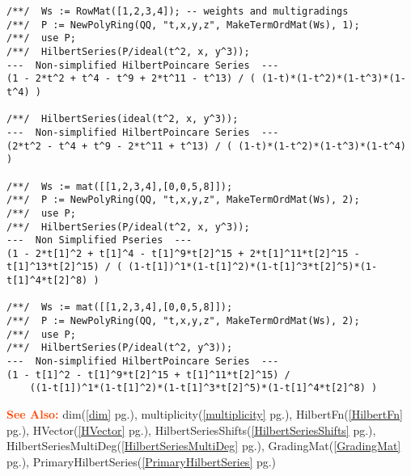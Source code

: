 \documentclass[a4paper]{mybook}
\newenvironment{command}{}{} %
\newcommand\SeeAlso{\par\textcolor{OrangeRed}{\textbf{\large See Also: }}}
\begin{document}
\begin{command}
\begin{Verbatim}[label=example, rulecolor=\color{PineGreen}, frame=single]
/**/  Ws := RowMat([1,2,3,4]); -- weights and multigradings
/**/  P := NewPolyRing(QQ, "t,x,y,z", MakeTermOrdMat(Ws), 1);
/**/  use P;
/**/  HilbertSeries(P/ideal(t^2, x, y^3));
---  Non-simplified HilbertPoincare Series  ---
(1 - 2*t^2 + t^4 - t^9 + 2*t^11 - t^13) / ( (1-t)*(1-t^2)*(1-t^3)*(1-t^4) )

/**/  HilbertSeries(ideal(t^2, x, y^3));
---  Non-simplified HilbertPoincare Series  ---
(2*t^2 - t^4 + t^9 - 2*t^11 + t^13) / ( (1-t)*(1-t^2)*(1-t^3)*(1-t^4) )

/**/  Ws := mat([[1,2,3,4],[0,0,5,8]]);
/**/  P := NewPolyRing(QQ, "t,x,y,z", MakeTermOrdMat(Ws), 2);
/**/  use P;
/**/  HilbertSeries(P/ideal(t^2, x, y^3));
---  Non Simplified Pseries  ---
(1 - 2*t[1]^2 + t[1]^4 - t[1]^9*t[2]^15 + 2*t[1]^11*t[2]^15 - t[1]^13*t[2]^15) / ( (1-t[1])^1*(1-t[1]^2)*(1-t[1]^3*t[2]^5)*(1-t[1]^4*t[2]^8) )

/**/  Ws := mat([[1,2,3,4],[0,0,5,8]]);
/**/  P := NewPolyRing(QQ, "t,x,y,z", MakeTermOrdMat(Ws), 2);
/**/  use P;
/**/  HilbertSeries(P/ideal(t^2, y^3));
---  Non-simplified HilbertPoincare Series  ---
(1 - t[1]^2 - t[1]^9*t[2]^15 + t[1]^11*t[2]^15) /
    ((1-t[1])^1*(1-t[1]^2)*(1-t[1]^3*t[2]^5)*(1-t[1]^4*t[2]^8) )
\end{Verbatim}


\SeeAlso %
  dim(\ref{dim} pg.\pageref{dim}), 
    multiplicity(\ref{multiplicity} pg.\pageref{multiplicity}), 
    HilbertFn(\ref{HilbertFn} pg.\pageref{HilbertFn}), 
    HVector(\ref{HVector} pg.\pageref{HVector}), 
    HilbertSeriesShifts(\ref{HilbertSeriesShifts} pg.\pageref{HilbertSeriesShifts}), 
    HilbertSeriesMultiDeg(\ref{HilbertSeriesMultiDeg} pg.\pageref{HilbertSeriesMultiDeg}), 
    GradingMat(\ref{GradingMat} pg.\pageref{GradingMat}), 
    PrimaryHilbertSeries(\ref{PrimaryHilbertSeries} pg.\pageref{PrimaryHilbertSeries})
\end{command} %
\end{document}
